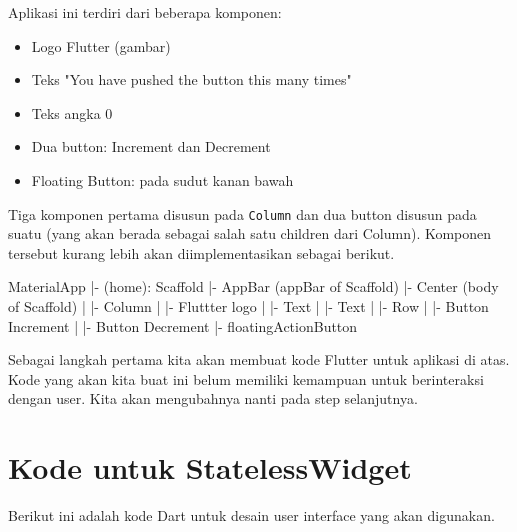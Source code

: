 \documentclass[a4paper,11pt]{article} %
\newcommand{\txtinline}[1]{\texttt{#1}}
\begin{document}
Aplikasi ini terdiri dari beberapa komponen:
\begin{itemize}
\item Logo Flutter (gambar)
\item Teks "You have pushed the button this many times"
\item Teks angka 0
\item Dua button: Increment dan Decrement
\item Floating Button: pada sudut kanan bawah
\end{itemize}

Tiga komponen pertama disusun pada \txtinline{Column} dan
dua button disusun pada suatu  (yang akan berada sebagai salah satu
children dari Column). Komponen tersebut kurang lebih akan diimplementasikan
sebagai berikut.
\begin{textcode}
MaterialApp
|- (home): Scaffold
   |- AppBar (appBar of Scaffold)
   |- Center (body of Scaffold)
   |  |- Column
   |     |- Fluttter logo
   |     |- Text
   |     |- Text
   |     |- Row
   |        |- Button Increment
   |        |- Button Decrement
   |- floatingActionButton
\end{textcode}


Sebagai langkah pertama kita akan membuat kode Flutter untuk aplikasi di atas.
Kode yang akan kita buat ini belum memiliki kemampuan untuk berinteraksi dengan
user. Kita akan mengubahnya nanti pada step selanjutnya.

\section{Kode untuk StatelessWidget}
Berikut ini adalah kode Dart untuk desain user interface yang akan digunakan.
\end{document}
